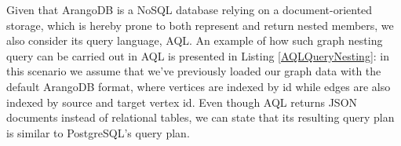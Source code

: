 Given that ArangoDB is a NoSQL database relying on a document-oriented storage, which is hereby prone to both represent and return nested members, we also consider its query language, AQL. An example of how such graph nesting query can be carried out in AQL is presented in Listing \ref{AQLQueryNesting}: in this scenario we assume that we've previously loaded our graph data with the default ArangoDB format, where  vertices are indexed by id while edges are also indexed by source and target vertex id. Even though AQL returns JSON documents instead of relational tables, we can state that its resulting query plan is similar to PostgreSQL's query plan.
%
%
%
%
%
%
%
